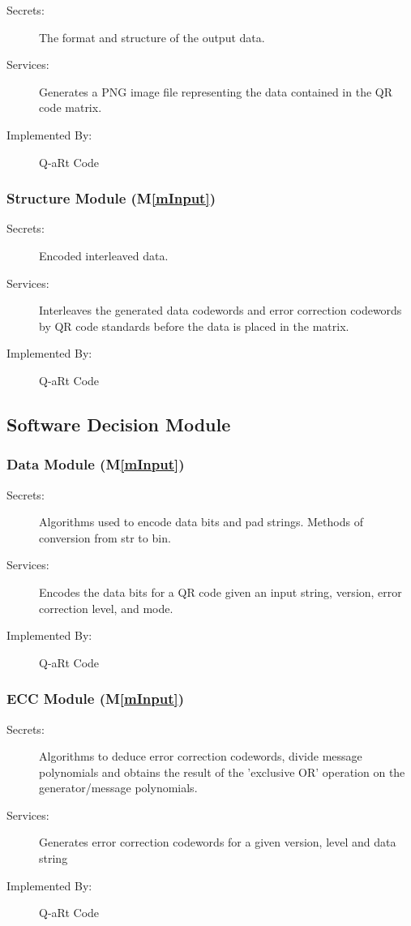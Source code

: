 \documentclass[12pt, titlepage]{article}
\newcommand{\mref}[1]{M\ref{#1}}
\begin{document}
\begin{description}
\item[Secrets:] The format and structure of the output data.
\item[Services:] Generates a PNG image file representing the data contained in the QR code matrix.
\item[Implemented By:] Q-aRt Code
\end{description}

\subsubsection{Structure Module (\mref{mInput})}

\begin{description}
\item[Secrets:] Encoded interleaved data.
\item[Services:] Interleaves the generated data codewords and error correction codewords by QR code standards before the data is placed in the matrix.
\item[Implemented By:] Q-aRt Code
\end{description}

\subsection{Software Decision Module}

\subsubsection{Data Module (\mref{mInput})}

\begin{description}
\item[Secrets:] Algorithms used to  encode data bits and pad strings. Methods of conversion from str to bin.
\item[Services:] Encodes the data bits for a QR code given an input string, version, error correction level, and mode.
\item[Implemented By:] Q-aRt Code
\end{description}

\subsubsection{ECC Module (\mref{mInput})}

\begin{description}
\item[Secrets:] Algorithms to deduce error correction codewords, divide message polynomials and obtains the result of the 'exclusive OR' operation on the generator/message polynomials.
\item[Services:] Generates error correction codewords for a given version, level and data string
\item[Implemented By:] Q-aRt Code
\end{description}
\end{document}
